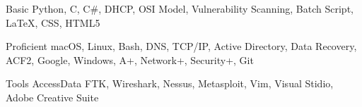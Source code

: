 

\begin{cvhonors}

  \cvhonor
    {Basic} %
    {Python, C, C\#, DHCP, OSI Model, Vulnerability Scanning, Batch Script, \LaTeX, CSS, HTML5} %

  \cvhonor
    {Proficient} %
    {macOS, Linux, Bash, DNS, TCP/IP, Active Directory, Data Recovery, ACF2, Google, Windows, A+, Network+, Security+, Git} %

  \cvhonor
    {Tools} %
    {AccessData FTK, Wireshark, Nessus, Metasploit, Vim, Visual Stidio, Adobe Creative Suite} %


\end{cvhonors}